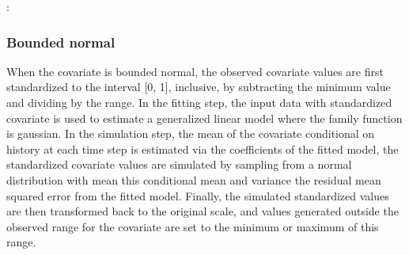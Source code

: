 \documentclass[letterpaper,10pt,english]{sphinxmanual}
\begin{document}
\begin{sphinxVerbatim}[commandchars=\\\{\}]
        
               
             \PYG{p}{[} \PYG{p}{]}
             \PYG{p}{[} \PYG{p}{]}
             
            
            
\end{sphinxVerbatim}

\sphinxAtStartPar
{}:
\begin{quote}

\end{quote}


\subsubsection{Bounded normal}
\label{\detokenize{Specifications/Covariate models:bounded-normal}}
\sphinxAtStartPar
When the covariate is bounded normal, the observed covariate values are first standardized to the interval {[}0, 1{]}, inclusive,
by subtracting the minimum value and dividing by the range. In the fitting step, the input data with standardized covariate
is used to estimate a generalized linear model where the family function is gaussian. In the simulation step,
the mean of the covariate conditional on history at each time step is estimated via the coefficients of the
fitted model, the standardized covariate values are simulated by sampling from a normal distribution with mean this conditional mean and variance the
residual mean squared error from the fitted model. Finally, the simulated standardized values are then transformed back to the original scale,
and values generated outside the observed range for the covariate are set to the minimum or maximum of this range.
\end{document}
